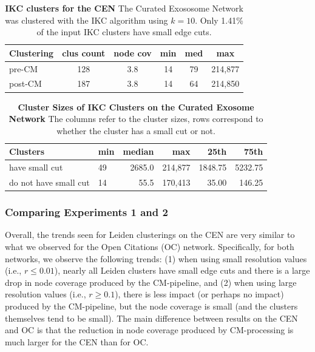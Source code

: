 \documentclass[11pt]{article}   	%
\begin{document}
\begin{table}[ht]
\centering
\begin{tabular}{lccccc}
  \hline
Clustering & clus count & node cov & min & med & max       \\ \hline
pre-CM       & 128         & 3.8       & 14  & 79  & 214,877 \\
post-CM & 187 & 3.8 & 14 & 64 & 214,850\\
  \hline
\end{tabular}
\caption[IKC clusters pre- and post-CM processing for the CEN]{\textbf{IKC clusters  for the CEN}
The Curated Exososome Network was clustered with the IKC algorithm using  $k=10$. 
Only 1.41\% of the input IKC clusters have small edge cuts.
}
\label{tab:IKC-11-CEN-basicstats}
\end{table}

\begin{table}[ht]
\centering
\begin{tabular}{llrrrr}
    \hline
      Clusters        & min & median & max    & 25th    & 75th    \\
    \hline
have small cut    & 49  & 2685.0  & 214,877 & 1848.75 & 5232.75 \\
do not have small cut & 14  & 55.5   & 170,413 & 35.00      & 146.25 \\
    \hline
\end{tabular}
\caption[Cluster Sizes of IKC Clusters on the CEN ]{\textbf{ Cluster Sizes of IKC Clusters on the Curated Exosome Network}  The columns refer to the  cluster sizes, rows correspond to whether the cluster has a small cut or not.}
\label{tab:IKC-CEN-sizes}
\end{table}

\subsubsection{Comparing Experiments 1 and 2}
Overall, the  trends seen for Leiden clusterings on the CEN are  very similar to what we observed for the Open Citations (OC) network.
Specifically, for both networks, we observe the following  trends: (1) when using small resolution values (i.e., $r \leq 0.01$),  nearly all Leiden clusters have small edge cuts and there is a large drop in node coverage produced by the CM-pipeline, and  (2) when using
large resolution values (i.e., $r \geq 0.1$), there is less impact (or perhaps no impact) produced by the CM-pipeline, but the node coverage is small (and the clusters themselves tend to be small).
The main difference between results on the CEN and OC is that the reduction in node coverage produced by CM-processing is
much larger  for the CEN than for OC.
\end{document}
